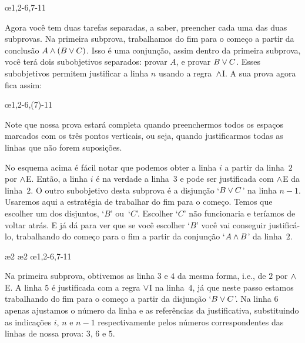\begin{fitchproof}
	\open
	\ellipsesline 
	\close
	\open
	\ellipsesline
	\close
	\oe{1,2-6,7-11}
\end{fitchproof}
Agora você tem duas tarefas separadas, a saber,  preencher cada uma das duas subprovas. Na primeira subprova, trabalhamos do fim para o começo a partir da conclusão $A \wedge (B \vee C)$. Isso é uma conjunção, assim dentro da primeira subprova, você terá dois subobjetivos separados: provar $A$, e provar $B \vee C$. Esses subobjetivos permitem justificar a linha $n$ usando a regra~$\wedge$I. A sua prova agora fica assim: 

\begin{fitchproof}
	\open
	\ellipsesline
	\ellipsesline
	\close
	\open
	\ellipsesline
	\close
	\oe{1,2-6,(7)-11}
\end{fitchproof}

Note que nossa prova estará completa quando preenchermos todos os espaços marcados com os três pontos verticais, ou seja, quando justificarmos todas as linhas que não forem suposições.

No esquema acima é fácil notar que podemos obter a linha $i$ a partir da linha~$2$ por $\wedge$E.  Então, a linha $i$ é na verdade a linha~$3$ e pode ser justificada com $\wedge$E  da linha~$2$. O outro subobjetivo desta subprova é a disjunção `$B \vee C$' na linha $n-1$. Usaremos aqui a estratégia de trabalhar do fim para o começo.
Temos que escolher um dos disjuntos, `$B$' ou~`$C$'. 
Escolher `$C$' não funcionaria e teríamos de voltar atrás. E já dá para ver que se você escolher `$B$' você vai conseguir justificá-lo, trabalhando do começo para o fim a partir da conjunção `$A \wedge B$' da linha~$2$.



\begin{fitchproof}
	\open
	\ae{2}
	\ae{2}
	\close
	\open
	\ellipsesline
	\close
	\oe{1,2-6,7-11}
\end{fitchproof}
Na primeira subprova, obtivemos as linha $3$ e $4$ da mesma forma, i.e.,  de $2$ por       $\wedge$E. 
 A linha $5$  é justificada com a regra $\vee$I na linha~$4$, já que neste passo estamos trabalhando do fim para o começo a partir da disjunção `$B \vee C$'.
Na linha $6$ apenas ajustamos o número da linha e as referências da justificativa, substituindo as indicações $i$, $n$ e $n-1$ respectivamente pelos números correspondentes das linhas de nossa prova: $3$, $6$ e $5$.


